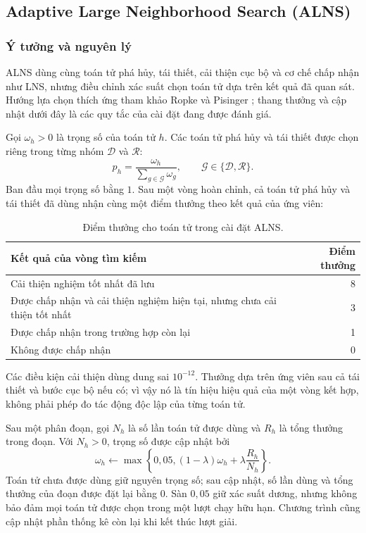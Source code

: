 \subsection[Adaptive Large Neighborhood Search]{Adaptive Large Neighborhood Search (ALNS)}

\subsubsection{Ý tưởng và nguyên lý}
ALNS dùng cùng toán tử phá hủy, tái thiết, cải thiện cục bộ và cơ chế chấp nhận như LNS, nhưng điều chỉnh xác suất chọn toán tử dựa trên kết quả đã quan sát. Hướng lựa chọn thích ứng tham khảo Ropke và Pisinger \cite{ropke2006}; thang thưởng và cập nhật dưới đây là các quy tắc của cài đặt đang được đánh giá.

Gọi $\omega_h>0$ là trọng số của toán tử $h$. Các toán tử phá hủy và tái thiết được chọn riêng trong từng nhóm $\mathcal D$ và $\mathcal R$:
\begin{equation}
 p_h=\frac{\omega_h}{\sum_{g\in\mathcal G}\omega_g},\qquad
 \mathcal G\in\{\mathcal D,\mathcal R\}.\label{eq:operator-probability}
\end{equation}
Ban đầu mọi trọng số bằng $1$. Sau một vòng hoàn chỉnh, cả toán tử phá hủy và tái thiết đã dùng nhận cùng một điểm thưởng theo kết quả của ứng viên:
\begin{table}[H]
\centering\small
\begin{tabularx}{\linewidth}{Xr}
\toprule
Kết quả của vòng tìm kiếm & Điểm thưởng \\
\midrule
Cải thiện nghiệm tốt nhất đã lưu & 8 \\
Được chấp nhận và cải thiện nghiệm hiện tại, nhưng chưa cải thiện tốt nhất & 3 \\
Được chấp nhận trong trường hợp còn lại & 1 \\
Không được chấp nhận & 0 \\
\bottomrule
\end{tabularx}
\caption{Điểm thưởng cho toán tử trong cài đặt ALNS.}\label{tab:operator-rewards}
\end{table}
Các điều kiện cải thiện dùng dung sai $10^{-12}$. Thưởng dựa trên ứng viên sau cả tái thiết và bước cục bộ nếu có; vì vậy nó là tín hiệu hiệu quả của một vòng kết hợp, không phải phép đo tác động độc lập của từng toán tử.

Sau một phân đoạn, gọi $N_h$ là số lần toán tử được dùng và $R_h$ là tổng thưởng trong đoạn. Với $N_h>0$, trọng số được cập nhật bởi
\begin{equation}
 \omega_h\leftarrow\max\left\{0{,}05,(1-\lambda)\omega_h+\lambda\frac{R_h}{N_h}\right\}.\label{eq:operator-weight-update}
\end{equation}
Toán tử chưa được dùng giữ nguyên trọng số; sau cập nhật, số lần dùng và tổng thưởng của đoạn được đặt lại bằng $0$. Sàn $0{,}05$ giữ xác suất dương, nhưng không bảo đảm mọi toán tử được chọn trong một lượt chạy hữu hạn. Chương trình cũng cập nhật phần thống kê còn lại khi kết thúc lượt giải.

